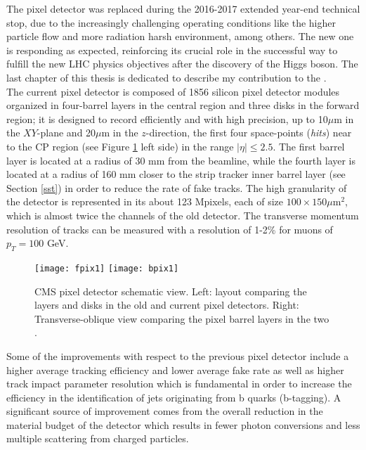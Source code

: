 \noindent The pixel detector was replaced during the 2016-2017 extended year-end technical stop, due to the increasingly challenging operating conditions like the higher particle flow and more radiation harsh environment, among others. The new one is responding as expected, reinforcing its crucial role in the successful way to fulfill the new LHC physics objectives after the discovery of the Higgs boson. The last chapter of this thesis is dedicated to describe my contribution to the .\\

\noindent  The current pixel detector is composed of 1856 silicon pixel detector modules organized in four-barrel layers in the central region and three disks in the forward region; it is designed to record efficiently and with high precision, up to 10$\mu$m in the $XY$-plane and 20$\mu$m in the $z$-direction, the first four space-points (\textit{hits}) near to the CP region (see Figure \ref{fig:pixel_tracker} left side) in the range $|\eta|\leq 2.5$. The first barrel layer is located at a radius of 30 mm from the beamline, while the fourth layer is located at a radius of 160 mm closer to the strip tracker inner barrel layer (see Section \ref{sst}) in order to reduce the rate of fake tracks. The high granularity of the detector is represented in its about 123 Mpixels, each of size $100\times150\mu$m$^2$, which is almost twice the channels of the old detector. The transverse momentum resolution of tracks can be measured with a resolution of 1-2\% for muons of $p_T=100$ GeV. \\

\begin{figure}[h!]
  \centering
  \texttt{[image: fpix1]}
  \texttt{[image: bpix1]}
  \caption[CMS pixel detector schematic view.]{CMS pixel detector schematic view. Left: layout comparing the layers and disks in the old and current pixel detectors. Right: Transverse-oblique view comparing the pixel barrel layers in the two \cite{pix_tdr}.}
  \label{fig:pixel_tracker}
\end{figure}

\noindent Some of the improvements with respect to the previous pixel detector include a higher average tracking efficiency and lower average fake rate as well as higher track impact parameter resolution which is fundamental in order to increase the efficiency in the identification of jets originating from b quarks (b-tagging). A significant source of improvement comes from the overall reduction in the material budget of the detector which results in fewer photon conversions and less multiple scattering from charged particles.    

